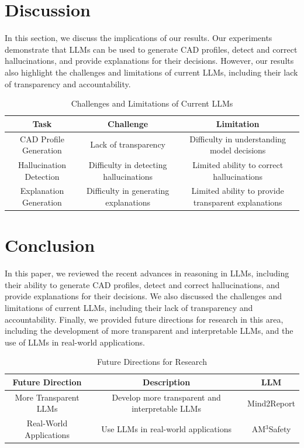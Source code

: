 \documentclass[11pt]{article}
\begin{document}
        \section{Discussion}
        \label{sec:discussion}
        In this section, we discuss the implications of our results. Our experiments demonstrate that LLMs can be used to generate CAD profiles, detect and correct hallucinations, and provide explanations for their decisions. However, our results also highlight the challenges and limitations of current LLMs, including their lack of transparency and accountability.\\
        \begin{table}[h]
        \centering
        \begin{tabular}{|c|c|c|}
        \hline
        \textbf{Task} & \textbf{Challenge} & \textbf{Limitation} \\
        \hline
        CAD Profile Generation & Lack of transparency & Difficulty in understanding model decisions \\
        \hline
        Hallucination Detection & Difficulty in detecting hallucinations & Limited ability to correct hallucinations \\
        \hline
        Explanation Generation & Difficulty in generating explanations & Limited ability to provide transparent explanations \\
        \hline
        \end{tabular}
        \caption{Challenges and Limitations of Current LLMs}
        \label{tab:challenges-and-limitations}
        \end{table}
        \section{Conclusion}
        \label{sec:conclusion}
        In this paper, we reviewed the recent advances in reasoning in LLMs, including their ability to generate CAD profiles, detect and correct hallucinations, and provide explanations for their decisions. We also discussed the challenges and limitations of current LLMs, including their lack of transparency and accountability. Finally, we provided future directions for research in this area, including the development of more transparent and interpretable LLMs, and the use of LLMs in real-world applications.\\
        \begin{table}[h]
        \centering
        \begin{tabular}{|c|c|c|}
        \hline
        \textbf{Future Direction} & \textbf{Description} & \textbf{LLM} \\
        \hline
        More Transparent LLMs & Develop more transparent and interpretable LLMs & Mind2Report \cite{cheng2026mind2reportcognitivedeepresearch} \\
        \hline
        Real-World Applications & Use LLMs in real-world applications & AM$^3$Safety \cite{zhu2026am3safetydataefficientalignment} \\
        \hline
        \end{tabular}
        \caption{Future Directions for Research}
        \label{tab:future-directions}
        \end{table}
\end{document}
